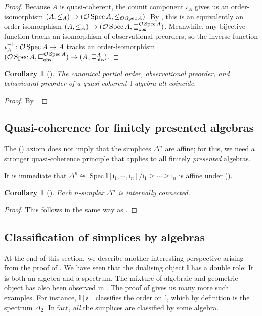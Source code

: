 \documentclass[a4paper,12pt]{amsart}
\newtheorem{corollary}[theorem]{Corollary}
\theoremstyle{definition}
\newcommand{\mbb}[1]{\mathbb{#1}}
\newcommand{\I}{\mbb I}
\newcommand{\ms}[1]{\mathsf{#1}}
\newcommand{\spec}{\operatorname{Spec}}
\begin{document}
\begin{proof}
  Because $A$ is quasi-coherent, the counit component $\iota_A$ gives us an order-isomorphism ${(A,\le_A)}\to (\opens\spec{A},\le_{\opens\spec{A}})$. By , this is an equivalently an order-isomorphism ${(A,\le_A)}\to {(\opens\spec{A},\obsle[\opens\spec{A}])}$. Meanwhile, any bijective function tracks an isomorphism of observational preorders, so the inverse function $\iota_A^{-1}\colon \opens\spec{A}\to A$ tracks an order-isomorphism  ${(\opens\spec{A},\obsle[\opens\spec{A}])}\to {(A,\obsle[A])}$. 
\end{proof}

\begin{corollary}[\AxiomSQCP]
  The canonical partial order, observational preorder, and behavioural preorder of a quasi-coherent $\I$-algebra all coincide.
\end{corollary}

\begin{proof}
  By .
\end{proof}


\subsection{Quasi-coherence for finitely presented algebras}

The (\AxiomSQCP) axiom does not imply that the simplices $\Delta^n$ are affine; for this, we need a stronger quasi-coherence principle that applies to all finitely \emph{presented} algebras.


\PrintAxiomSQCF

It is immediate that $\Delta^n\cong \spec\I[\ms{i}_1,\cdots,\ms{i}_n]/\ms{i}_1\geq \cdots \geq \ms{i}_n$ is affine under (\AxiomSQCF).

\begin{corollary}[\AxiomSQCF]
  Each $n$-simplex $\Delta^n$ is internally connected.
\end{corollary}

\begin{proof}
  This follows in the same way as .
\end{proof}

\subsection{Classification of simplices by algebras}

At the end of this section, we describe another interesting perspective arising from the proof of . We have seen that the dualising object $\I$ has a double role: It is both an algebra and a spectrum. The mixture of algebraic and geometric object has also been observed in . The proof of  gives us many more such examples. For instance, $\I[i]$ classifies the order on $\I$, which by definition is the spectrum $\Delta_2$. In fact, \emph{all} the simplices are classified by some algebra.
\end{document}
